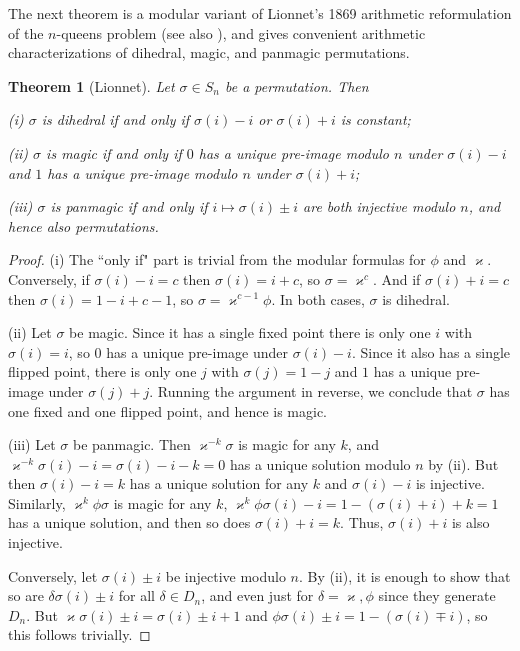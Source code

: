 \documentclass[11pt]{article}
\theoremstyle{plain}
\newtheorem{theorem}{Theorem}
\theoremstyle{definition}
\newcommand{\+}[1]{{#1}^\times}
\def\s{{\sigma}}
\def\k{{\varkappa}}
\begin{document}
The next theorem is a modular variant of Lionnet's 1869 arithmetic reformulation of the $n$-queens problem \cite{BS1} (see also \cite{AlKi}), and gives convenient arithmetic characterizations of dihedral, magic, and panmagic permutations. 
\begin{theorem}[Lionnet]\label{pmagic criteria} Let $\s\in S_n$ be a permutation. Then
\medskip

\noindent\textup{(i)} $\s$ is dihedral if and only if $\sigma(i)-i$ or $\sigma(i)+i$ is constant;
\medskip

\noindent\textup{(ii)} $\s$ is magic if and only if  $0$ has a unique pre-image modulo $n$ under $\sigma(i)-i$ and $1$ has a unique pre-image modulo $n$ under $\sigma(i)+i$;
\medskip

\noindent\textup{(iii)} 
$\s$ is panmagic if and only if $i\mapsto\sigma(i)\pm i$ are both injective modulo $n$, and hence also permutations. 
\end{theorem}
\begin{proof}\phantom{a} 

\noindent(i) The ``only if" part is trivial from the modular formulas for $\phi$ and $\k$. Conversely, if $\s(i)-i=c$ then $\s(i)=i+c$, so $\s=\k^c$. And if $\s(i)+i=c$ then $\s(i)=1-i+c-1$, so $\s=\k^{c-1}\phi$. In both cases, $\s$ is dihedral.
\smallskip

\noindent(ii) Let $\s$ be magic. Since it has a single fixed point there is only one $i$ with $\s(i)=i$, so $0$ has a unique pre-image under $\s(i)-i$. Since it also has a single flipped point, there is only one $j$ with $\s(j)=1-j$ and $1$ has a unique pre-image under $\s(j)+j$. Running the argument in reverse, we conclude that $\s$ has one fixed and one flipped point, and hence is magic. 
\medskip

\noindent(iii) Let $\s$ be panmagic. Then $\k^{-k}\s$ is magic for any $k$, and $\k^{-k}\s(i)-i=\s(i)-i-k=0$ has a unique solution modulo $n$ by (ii). But then $\s(i)-i=k$ has a unique solution for any $k$ and $\s(i)-i$ is injective. Similarly, $\k^{k}\phi\s$ is magic for any $k$, $\k^{k}\phi\s(i)-i=1-(\s(i)+i)+k=1$ has a unique solution, and then so does $\s(i)+i=k$. Thus, $\s(i)+i$ is also injective. 

Conversely, let $\sigma(i)\pm i$ be injective modulo $n$. By (ii), it is enough to show that so are $\delta\s(i)\pm i$ for all $\delta\in D_n$, and even just for $\delta=\k,\phi$ since they generate $D_n$. But $\k\s(i)\pm i=\sigma(i)\pm i+1$ and $\phi\s(i)\pm i=1-(\sigma(i)\mp i)$, so this follows trivially.
\end{proof}
\end{document}
